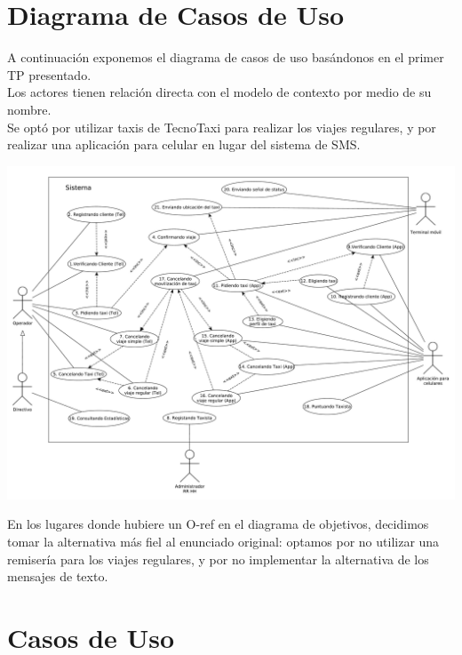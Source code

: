 \documentclass[a4paper]{article}
\begin{document}
\newpage
\section{Diagrama de Casos de Uso}

A continuaci\'on exponemos el diagrama de casos de uso bas\'andonos en el primer TP presentado. \\
Los actores tienen relaci\'on directa con el modelo de contexto por medio de su nombre.\\
Se opt\'o por utilizar taxis de TecnoTaxi para realizar los viajes regulares, y por realizar una aplicaci\'on para celular en lugar del sistema de SMS.
\bigskip

\begin{center}
\includegraphics[width=1.1\textwidth,keepaspectratio,angle=90]{diag_CasosDeUso.pdf}
\end{center}
 
\newpage

En los lugares donde hubiere un O-ref en el diagrama de objetivos, decidimos tomar la alternativa m\'as fiel al enunciado original: optamos por no utilizar una remiser\'ia para los viajes regulares, y por no implementar la alternativa de los mensajes de texto.

\section{Casos de Uso}
\end{document}
